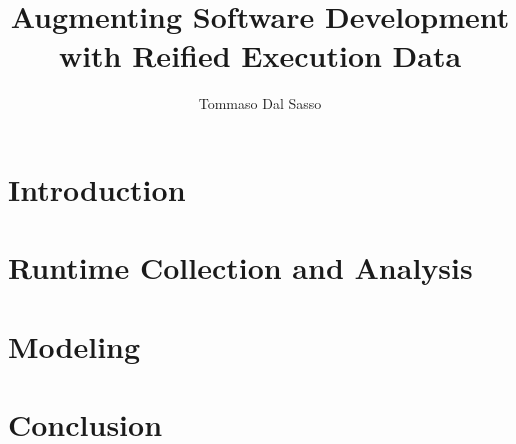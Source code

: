 \documentclass[]{tommaso-thesis}
\title{Augmenting Software Development \\with Reified Execution Data}
\author{Tommaso Dal Sasso}
\begin{document}
\maketitle %

\frontmatter %








\tableofcontents
\listoffigures %
\listoftables %

\mainmatter

\part{Introduction}
  
  

\part{Runtime Collection and Analysis}
  
  
  
  

\part{Modeling}
  
  

\part{Conclusion}
  






\backmatter


%

%


\cleardoublepage
\theindex %
\end{document}
